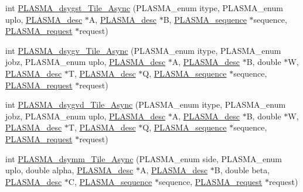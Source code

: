 \begin{DoxyCompactItemize}
\item 
int \hyperlink{group__double__Tile__Async_ga81f098686ef0966de91ce9d450ee22e6_ga81f098686ef0966de91ce9d450ee22e6}{P\+L\+A\+S\+M\+A\+\_\+dsygst\+\_\+\+Tile\+\_\+\+Async} (P\+L\+A\+S\+M\+A\+\_\+enum itype, P\+L\+A\+S\+M\+A\+\_\+enum uplo, \hyperlink{structplasma__desc__t}{P\+L\+A\+S\+M\+A\+\_\+desc} $\ast$A, \hyperlink{structplasma__desc__t}{P\+L\+A\+S\+M\+A\+\_\+desc} $\ast$B, \hyperlink{structplasma__sequence__t}{P\+L\+A\+S\+M\+A\+\_\+sequence} $\ast$sequence, \hyperlink{structplasma__request__t}{P\+L\+A\+S\+M\+A\+\_\+request} $\ast$request)
\item 
int \hyperlink{group__double__Tile__Async_gae8c4f57082f99df779dfa16f9ec5196d_gae8c4f57082f99df779dfa16f9ec5196d}{P\+L\+A\+S\+M\+A\+\_\+dsygv\+\_\+\+Tile\+\_\+\+Async} (P\+L\+A\+S\+M\+A\+\_\+enum itype, P\+L\+A\+S\+M\+A\+\_\+enum jobz, P\+L\+A\+S\+M\+A\+\_\+enum uplo, \hyperlink{structplasma__desc__t}{P\+L\+A\+S\+M\+A\+\_\+desc} $\ast$A, \hyperlink{structplasma__desc__t}{P\+L\+A\+S\+M\+A\+\_\+desc} $\ast$B, double $\ast$W, \hyperlink{structplasma__desc__t}{P\+L\+A\+S\+M\+A\+\_\+desc} $\ast$T, \hyperlink{structplasma__desc__t}{P\+L\+A\+S\+M\+A\+\_\+desc} $\ast$Q, \hyperlink{structplasma__sequence__t}{P\+L\+A\+S\+M\+A\+\_\+sequence} $\ast$sequence, \hyperlink{structplasma__request__t}{P\+L\+A\+S\+M\+A\+\_\+request} $\ast$request)
\item 
int \hyperlink{group__double__Tile__Async_ga83ab88e3f18fca0145e04f574d1b92f6_ga83ab88e3f18fca0145e04f574d1b92f6}{P\+L\+A\+S\+M\+A\+\_\+dsygvd\+\_\+\+Tile\+\_\+\+Async} (P\+L\+A\+S\+M\+A\+\_\+enum itype, P\+L\+A\+S\+M\+A\+\_\+enum jobz, P\+L\+A\+S\+M\+A\+\_\+enum uplo, \hyperlink{structplasma__desc__t}{P\+L\+A\+S\+M\+A\+\_\+desc} $\ast$A, \hyperlink{structplasma__desc__t}{P\+L\+A\+S\+M\+A\+\_\+desc} $\ast$B, double $\ast$W, \hyperlink{structplasma__desc__t}{P\+L\+A\+S\+M\+A\+\_\+desc} $\ast$T, \hyperlink{structplasma__desc__t}{P\+L\+A\+S\+M\+A\+\_\+desc} $\ast$Q, \hyperlink{structplasma__sequence__t}{P\+L\+A\+S\+M\+A\+\_\+sequence} $\ast$sequence, \hyperlink{structplasma__request__t}{P\+L\+A\+S\+M\+A\+\_\+request} $\ast$request)
\item 
int \hyperlink{group__double__Tile__Async_gacd3643568a6094c0849d10ae215d9249_gacd3643568a6094c0849d10ae215d9249}{P\+L\+A\+S\+M\+A\+\_\+dsymm\+\_\+\+Tile\+\_\+\+Async} (P\+L\+A\+S\+M\+A\+\_\+enum side, P\+L\+A\+S\+M\+A\+\_\+enum uplo, double alpha, \hyperlink{structplasma__desc__t}{P\+L\+A\+S\+M\+A\+\_\+desc} $\ast$A, \hyperlink{structplasma__desc__t}{P\+L\+A\+S\+M\+A\+\_\+desc} $\ast$B, double beta, \hyperlink{structplasma__desc__t}{P\+L\+A\+S\+M\+A\+\_\+desc} $\ast$C, \hyperlink{structplasma__sequence__t}{P\+L\+A\+S\+M\+A\+\_\+sequence} $\ast$sequence, \hyperlink{structplasma__request__t}{P\+L\+A\+S\+M\+A\+\_\+request} $\ast$request)

\end{DoxyCompactItemize}
